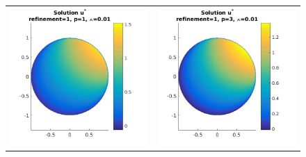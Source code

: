 \documentclass{article}
\begin{document}
\begin{figure}[!ht]
\begin{tabular}{c c}
\includegraphics[scale=0.7]{umustar_123.png} &
\includegraphics[scale=0.7]{umustar_223.png} \\

\end{tabular}
\end{figure}
\end{document}
